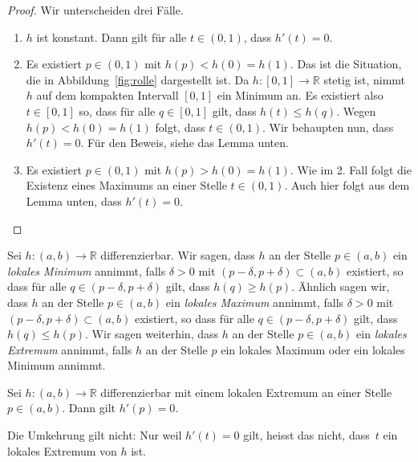 \documentclass[../main.tex]{subfiles}
\begin{document}
\begin{proof}
  Wir unterscheiden drei Fälle.
  \begin{enumerate}[1.]
    \item $h$ ist konstant.
      Dann gilt für alle $t\in (0, 1)$,
      dass $h'(t) = 0$.
    \item Es existiert $p \in (0, 1)$ 
      mit $h(p) < h(0) = h(1)$.
      Das ist die Situation, die in
      Abbildung~\ref{fig:rolle} dargestellt ist.
      Da $h \colon [0, 1] \to \mathbb{R}$ 
      stetig ist, nimmt $h$ auf dem
      kompakten Intervall
      $[0, 1]$ ein Minimum an.
      Es existiert also $t \in [0, 1]$
      so, dass für alle $q \in [0, 1]$ 
      gilt, dass
      $h(t) \leq h(q)$.
      Wegen $h(p) < h(0) = h(1)$ folgt,
      dass $t \in (0, 1)$.
      Wir behaupten nun, dass $h'(t) = 0$.
      Für den Beweis, siehe das Lemma unten.
    \item Es existiert $p \in (0, 1)$ mit
      $h(p) > h(0) = h(1)$. Wie im 2. Fall
      folgt die Existenz eines Maximums
      an einer Stelle $t \in (0, 1)$.
      Auch hier folgt aus dem Lemma unten,
      dass $h'(t) = 0$. \qedhere
  \end{enumerate}
\end{proof}

\begin{definition}
  Sei $h \colon (a, b) \to \mathbb{R}$ differenzierbar.
  Wir sagen, dass $h$ an der Stelle
  $p \in (a, b)$ ein \emph{lokales
  Minimum} annimmt, falls $\delta > 0$
  mit $ (p - \delta, p + \delta)
  \subset (a, b)$ existiert,
  so dass für alle $q \in (p - \delta, p + \delta)$
  gilt, dass  $h(q) \geq h(p)$. Ähnlich sagen wir,
  dass $h$ an der Stelle
  $p \in (a, b)$ ein \emph{lokales Maximum}
  annimmt, falls $\delta > 0$ mit
  $(p - \delta, p + \delta) \subset (a, b)$
  existiert, so dass für alle $q \in (p - \delta, p + \delta)$ 
  gilt, dass $h(q) \leq h(p)$.
  Wir sagen weiterhin, dass $h$ an der
  Stelle $p \in (a, b)$ ein
  \emph{lokales Extremum} annimmt, falls 
  $h$ an der Stelle $p$
  ein lokales Maximum oder ein lokales Minimum
  annimmt.
\end{definition}


\begin{lemma*}
  Sei $h \colon (a, b) \to \mathbb{R}$
  differenzierbar mit einem lokalen
  Extremum an einer Stelle
  $p \in (a, b)$. Dann gilt $h'(p) = 0$.
\end{lemma*}

\begin{remark}
  Die Umkehrung gilt nicht: Nur weil $h'(t) = 0$ 
  gilt, heisst das nicht, dass~$t$ ein
  lokales Extremum von $h$ ist.
\end{remark}
\end{document}
